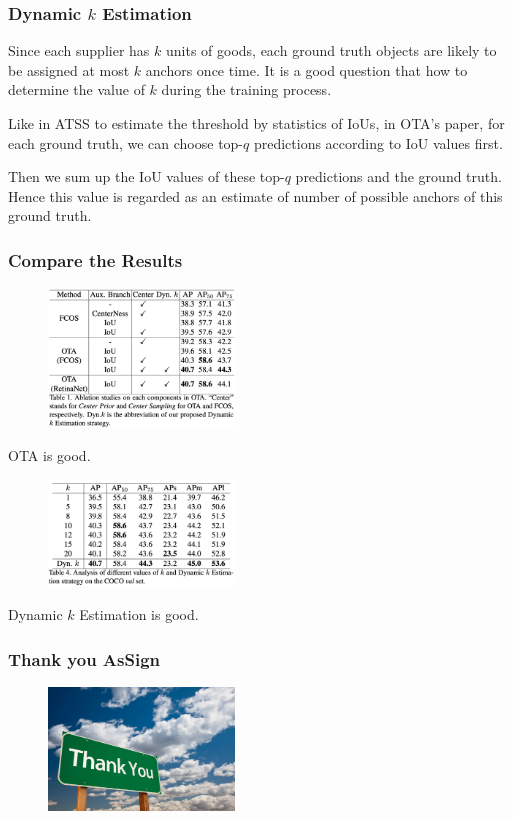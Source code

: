 \documentclass[slidetop, mathserif, dvipsnames]{beamer}
\begin{document}
\begin{frame}
    \frametitle{Dynamic $k$ Estimation}

    Since each supplier has $k$ units of goods, each ground truth objects are
    likely to be assigned at most $k$ anchors once time.
    It is a good question that how to determine the value of $k$ during the 
    training process.

    \quad

    Like in ATSS to estimate the threshold by statistics of IoUs,
    in OTA's paper, for each ground truth, we can choose top-$q$ predictions
    according to IoU values first.

    \quad 

    Then we sum up the IoU values of these top-$q$ predictions and the ground
    truth. Hence this value is regarded as an estimate of number of possible
    anchors of this ground truth.

\end{frame}

\begin{frame}
    \frametitle{Compare the Results}

    \begin{minipage}{5cm}
    \begin{figure}
        \includegraphics[width=140pt]{pics/ota_compare1.png}
    \end{figure}
    OTA is good.
    \end{minipage}
    \begin{minipage}{5cm}
    \begin{figure}
        \includegraphics[width=140pt]{pics/ota_compare2.png}
    \end{figure}
    Dynamic $k$ Estimation is good.

    \quad

    \quad

    \end{minipage}

\end{frame}

\begin{frame}
    \frametitle{Thank you AsSign}

    \begin{figure}
        \includegraphics[width=140pt]{pics/thank-you-road-sign1.jpeg}
    \end{figure}

\end{frame}
\end{document}
